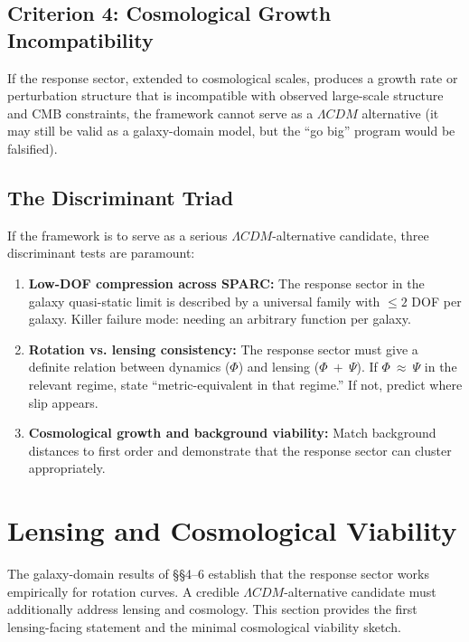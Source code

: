 \documentclass[11pt]{article}
\begin{document}
\subsection{Criterion 4: Cosmological Growth Incompatibility}\label{criterion-4-cosmological-growth-incompatibility}

If the response sector, extended to cosmological scales, produces a growth rate or perturbation structure that is incompatible with observed large-scale structure and CMB constraints, the framework cannot serve as a \(\Lambda CDM\) alternative (it may still be valid as a galaxy-domain model, but the ``go big'' program would be falsified).

\subsection{The Discriminant Triad}\label{the-discriminant-triad}

\citep{PoissonWill2014, Carroll2019Spacetime}
If the framework is to serve as a serious \(\Lambda CDM\)-alternative candidate, three discriminant tests are paramount:

\begin{enumerate}
\def\labelenumi{(\roman{enumi})}
\item
  \textbf{Low-DOF compression across SPARC:} The response sector in the galaxy quasi-static limit is described by a universal family with \(\leq 2\) DOF per galaxy. Killer failure mode: needing an arbitrary function per galaxy.
\item
  \textbf{Rotation vs. lensing consistency:} The response sector must give a definite relation between dynamics (\(\Phi\)) and lensing (\(\Phi\  + \ \Psi\)). If \(\Phi\  \approx \ \Psi\) in the relevant regime, state ``metric-equivalent in that regime.'' If not, predict where slip appears.
\item
  \textbf{Cosmological growth and background viability:} Match background distances to first order and demonstrate that the response sector can cluster appropriately.
\end{enumerate}


\section{Lensing and Cosmological Viability}\label{lensing-and-cosmological-viability}

The galaxy-domain results of §§4--6 establish that the response sector works empirically for rotation curves. A credible \(\Lambda CDM\)-alternative candidate must additionally address lensing and cosmology. This section provides the first lensing-facing statement and the minimal cosmological viability sketch.
\end{document}

